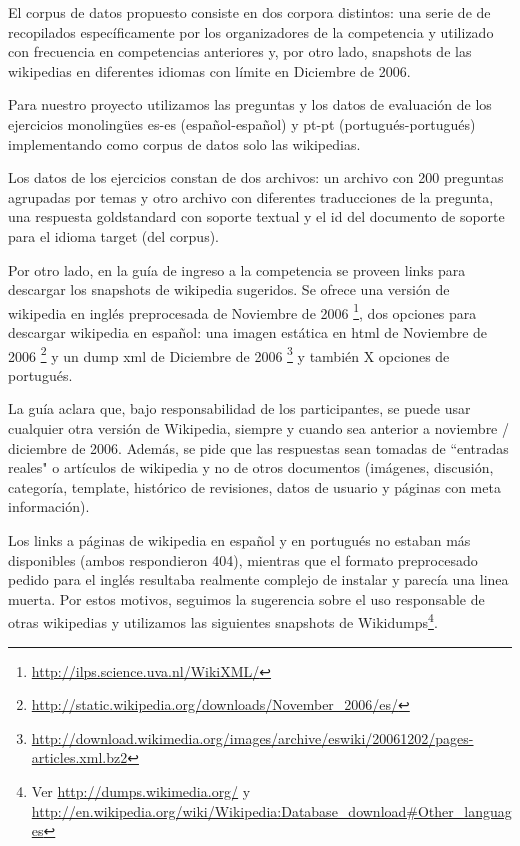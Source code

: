 El corpus de datos propuesto consiste en dos corpora distintos: una serie de de recopilados específicamente por los organizadores de la competencia y utilizado con frecuencia en competencias anteriores y, por otro lado, snapshots de las wikipedias en diferentes idiomas con límite en Diciembre de 2006.

Para nuestro proyecto utilizamos las preguntas y los datos de evaluación de los ejercicios monolingües es-es (español-español) y pt-pt (portugués-portugués) implementando como corpus de datos solo las wikipedias.

Los datos de los ejercicios constan de dos archivos: un archivo con 200 preguntas agrupadas por temas y otro archivo con diferentes traducciones de la pregunta, una respuesta goldstandard con soporte textual y el id del documento de soporte para el idioma target (del corpus).

Por otro lado, en la guía de ingreso a la competencia\cite{GuidelineClef07} se proveen links para descargar los snapshots de wikipedia sugeridos. Se ofrece una versión de wikipedia en inglés preprocesada de Noviembre de 2006 \footnote{\url{http://ilps.science.uva.nl/WikiXML/}}, dos opciones para descargar wikipedia en español: una imagen estática en html de Noviembre de 2006 \footnote{\url{http://static.wikipedia.org/downloads/November_2006/es/}} y un dump xml de Diciembre de 2006 \footnote{\url{http://download.wikimedia.org/images/archive/eswiki/20061202/pages-articles.xml.bz2}} y también X opciones de portugués.

La guía aclara que, bajo responsabilidad de los participantes, se puede usar
cualquier otra versión de Wikipedia, siempre y cuando sea anterior a noviembre / diciembre de 2006.
Además, se pide que las respuestas sean tomadas de ``entradas reales" o artículos de wikipedia y
no de otros documentos (imágenes, discusión, categoría, template, histórico de revisiones, datos de usuario y páginas con meta información).

Los links a páginas de wikipedia en español y en portugués no estaban más disponibles (ambos respondieron 404), mientras que el formato
preprocesado pedido para el inglés resultaba realmente complejo de instalar y parecía una linea muerta. Por estos motivos,
seguimos la sugerencia sobre el uso responsable de otras wikipedias y utilizamos las siguientes snapshots de Wikidumps\footnote{Ver \url{http://dumps.wikimedia.org/} y \url{http://en.wikipedia.org/wiki/Wikipedia:Database_download\#Other_languages}}.


